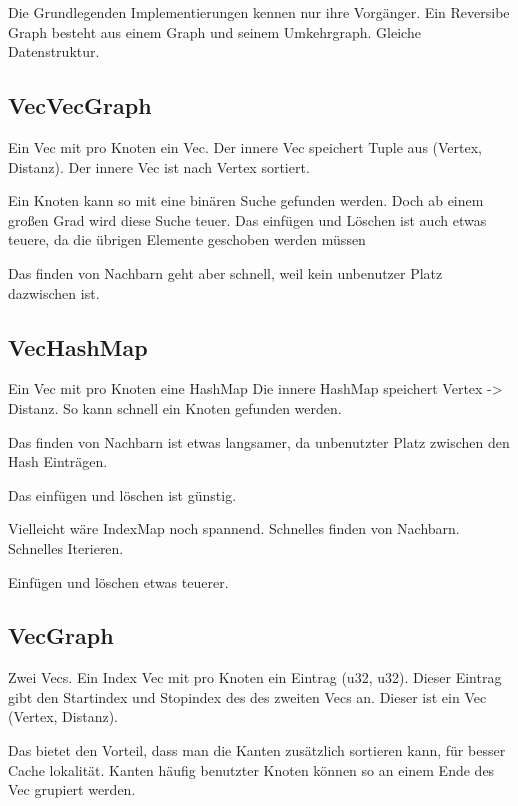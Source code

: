 Die Grundlegenden Implementierungen kennen nur ihre Vorgänger.
Ein Reversibe Graph besteht aus einem Graph und seinem Umkehrgraph.
Gleiche Datenstruktur.

\subsection{VecVecGraph}
Ein Vec mit pro Knoten ein Vec.
Der innere Vec speichert Tuple aus (Vertex, Distanz).
Der innere Vec ist nach Vertex sortiert.

Ein Knoten kann so mit eine binären Suche gefunden werden.
Doch ab einem großen Grad wird diese Suche teuer.
Das einfügen und Löschen ist auch etwas teuere, da die übrigen Elemente geschoben werden müssen

Das finden von Nachbarn geht aber schnell, weil kein unbenutzer Platz dazwischen ist.

\subsection{VecHashMap}
Ein Vec mit pro Knoten eine HashMap
Die innere HashMap speichert Vertex -> Distanz.
So kann schnell ein Knoten gefunden werden.

Das finden von Nachbarn ist etwas langsamer, da unbenutzter Platz zwischen den Hash Einträgen.

Das einfügen und löschen ist günstig.

Vielleicht wäre IndexMap noch spannend.
Schnelles finden von Nachbarn.
Schnelles Iterieren.

Einfügen und löschen etwas teuerer.

\subsection{VecGraph}
Zwei Vecs.
Ein Index Vec mit pro Knoten ein Eintrag (u32, u32).
Dieser Eintrag gibt den Startindex und Stopindex des des zweiten Vecs an.
Dieser ist ein Vec (Vertex, Distanz).

Das bietet den Vorteil, dass man die Kanten zusätzlich sortieren kann, für besser Cache lokalität.
Kanten häufig benutzter Knoten können so an einem Ende des Vec grupiert werden.